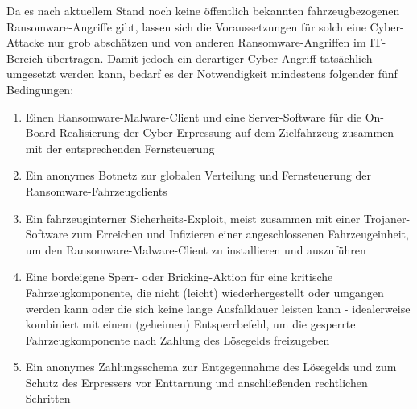 Da es nach aktuellem Stand noch keine öffentlich bekannten fahrzeugbezogenen 
Ransomware-Angriffe gibt, lassen sich die Voraussetzungen für solch eine Cyber-Attacke 
nur grob abschätzen und von anderen Ransomware-Angriffen im IT-Bereich übertragen. Damit 
jedoch ein derartiger Cyber-Angriff tatsächlich umgesetzt werden kann, bedarf es der 
Notwendigkeit mindestens folgender fünf Bedingungen:

\begin{enumerate}
    \item Einen Ransomware-Malware-Client und eine Server-Software für die On-Board-Realisierung 
    der Cyber-Erpressung auf dem Zielfahrzeug zusammen mit der entsprechenden Fernsteuerung
    \item Ein anonymes Botnetz zur globalen Verteilung und Fernsteuerung der Ransomware-Fahrzeugclients
    \item Ein fahrzeuginterner Sicherheits-Exploit, meist zusammen mit einer Trojaner-Software zum 
    Erreichen und Infizieren einer angeschlossenen Fahrzeugeinheit, um den Ransomware-Malware-Client 
    zu installieren und auszuführen
    \item Eine bordeigene Sperr- oder Bricking-Aktion für eine kritische Fahrzeugkomponente, die 
    nicht (leicht) wiederhergestellt oder umgangen werden kann oder die sich keine lange Ausfalldauer 
    leisten kann - idealerweise kombiniert mit einem (geheimen) Entsperrbefehl, um die gesperrte 
    Fahrzeugkomponente nach Zahlung des Lösegelds freizugeben
    \item Ein anonymes Zahlungsschema zur Entgegennahme des Lösegelds und zum Schutz des Erpressers 
    vor Enttarnung und anschließenden rechtlichen Schritten
\end{enumerate}

